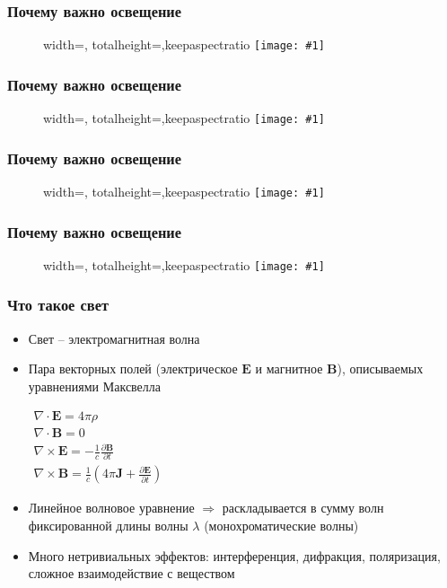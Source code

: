\documentclass[10pt]{beamer}
\newcommand{\slideimage}[1]{
  \begin{figure}
    \begin{adjustbox}{width=\textwidth, totalheight=\textheight-2\baselineskip-2\baselineskip,keepaspectratio}
      \texttt{[image: \#1]}
    \end{adjustbox}
  \end{figure}
}
\begin{document}

\begin{frame}[fragile]
\frametitle{Почему важно освещение}
\slideimage{suzanne-material.png}
\end{frame}


\begin{frame}[fragile]
\frametitle{Почему важно освещение}
\slideimage{zelda.png}
\end{frame}


\begin{frame}[fragile]
\frametitle{Почему важно освещение}
\slideimage{win31.png}
\end{frame}

\begin{frame}[fragile]
\frametitle{Почему важно освещение}
\slideimage{zelda2.jpg}
\end{frame}


\begin{frame}[fragile]
\frametitle{Что такое свет}
\begin{itemize}
\item Свет -- электромагнитная волна
\pause
\item Пара векторных полей (электрическое \begin{math}\mathbf{E}\end{math} и магнитное \begin{math}\mathbf{B}\end{math}), описываемых уравнениями Максвелла
\begin{center}
\begin{math}
\begin{matrix}
\nabla \cdot \mathbf{E} = 4 \pi \rho \\
\nabla \cdot \mathbf{B} = 0 \\
\nabla \times \mathbf{E} = -\frac{1}{c} \frac{\partial \mathbf B}{\partial t} \\
\nabla \times \mathbf{B} = \frac{1}{c} \left(4 \pi \mathbf J + \frac{\partial \mathbf E}{\partial t} \right)
\end{matrix}
\end{math}
\end{center}
\pause
\item Линейное волновое уравнение \begin{math}\Longrightarrow\end{math} раскладывается в сумму волн фиксированной длины волны \begin{math}\lambda\end{math} (монохроматические волны)
\pause
\item Много нетривиальных эффектов: интерференция, дифракция, поляризация, сложное взаимодействие с веществом
\end{itemize}
\end{frame}
\end{document}
